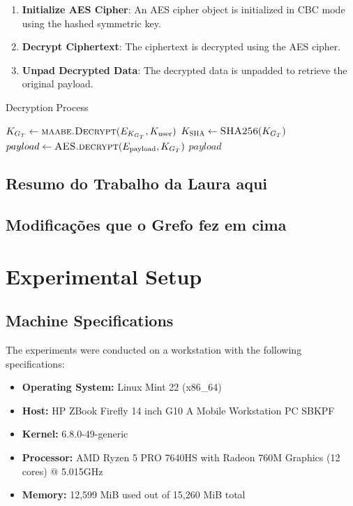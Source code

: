\documentclass[cic,tc,english]{iiufrgs}
\begin{document}
    \begin{enumerate}
        \item \textbf{Initialize AES Cipher}: An AES cipher object is initialized in CBC mode using the hashed symmetric key.
        \item \textbf{Decrypt Ciphertext}: The ciphertext is decrypted using the AES cipher.
        \item \textbf{Unpad Decrypted Data}: The decrypted data is unpadded to retrieve the original payload.
    \end{enumerate}

    \begin{algorithm}
        \caption{Decryption Process}
        \label{alg:decryption_process}
        \scriptsize
        \begin{algorithmic}[1]
            \State $K_{G_T} \gets \textsc{maabe.Decrypt}(E_{K_{G_T}}, K_{\text{user}})$
            \State $K_{\textsc{SHA}} \gets \textsc{SHA256}(K_{G_T})$
            \State $payload \gets \textsc{AES.decrypt}(E_{\text{payload}}, K_{G_T})$
            \State \Return $payload$
        \EndProcedure
        \end{algorithmic}
    \end{algorithm}

    \section{Resumo do Trabalho da Laura aqui}
    \section{Modificações que o Grefo fez em cima}


\chapter{Experimental Setup}


    \section{Machine Specifications}
    The experiments were conducted on a workstation with the following specifications:

    \begin{itemize}
        \item \textbf{Operating System:} Linux Mint 22 (x86\_64)
        \item \textbf{Host:} HP ZBook Firefly 14 inch G10 A Mobile Workstation PC SBKPF
        \item \textbf{Kernel:} 6.8.0-49-generic
        \item \textbf{Processor:} AMD Ryzen 5 PRO 7640HS with Radeon 760M Graphics (12 cores) @ 5.015GHz
        \item \textbf{Memory:} 12,599 MiB used out of 15,260 MiB total
    \end{itemize}
\end{document}
